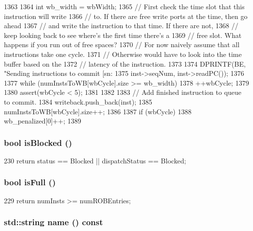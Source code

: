 \begin{DoxyCode}
1363 {
1364     int wb_width = wbWidth;
1365     // First check the time slot that this instruction will write
1366     // to.  If there are free write ports at the time, then go ahead
1367     // and write the instruction to that time.  If there are not,
1368     // keep looking back to see where's the first time there's a
1369     // free slot.  What happens if you run out of free spaces?
1370     // For now naively assume that all instructions take one cycle.
1371     // Otherwise would have to look into the time buffer based on the
1372     // latency of the instruction.
1373 
1374     DPRINTF(BE, "Sending instructions to commit [sn:%
1375             inst->seqNum, inst->readPC());
1376 
1377     while (numInstsToWB[wbCycle].size >= wb_width) {
1378         ++wbCycle;
1379 
1380         assert(wbCycle < 5);
1381     }
1382 
1383     // Add finished instruction to queue to commit.
1384     writeback.push_back(inst);
1385     numInstsToWB[wbCycle].size++;
1386 
1387     if (wbCycle)
1388         wb_penalized[0]++;
1389 }
\end{DoxyCode}
\hypertarget{classBackEnd_ae6ec007d68382eb124ed25bc90ae9c17}{
\subsubsection[{isBlocked}]{\setlength{\rightskip}{0pt plus 5cm}bool isBlocked ()}}
\label{classBackEnd_ae6ec007d68382eb124ed25bc90ae9c17}



\begin{DoxyCode}
230 { return status == Blocked || dispatchStatus == Blocked; }
\end{DoxyCode}
\hypertarget{classBackEnd_a3e70330939fdfc4dbc2f60c1a660584d}{
\subsubsection[{isFull}]{\setlength{\rightskip}{0pt plus 5cm}bool isFull ()}}
\label{classBackEnd_a3e70330939fdfc4dbc2f60c1a660584d}



\begin{DoxyCode}
229 { return numInsts >= numROBEntries; }
\end{DoxyCode}
\hypertarget{classBackEnd_a37627d5d5bba7f4a8690c71c2ab3cb07}{
\subsubsection[{name}]{\setlength{\rightskip}{0pt plus 5cm}std::string name () const}}
\label{classBackEnd_a37627d5d5bba7f4a8690c71c2ab3cb07}



